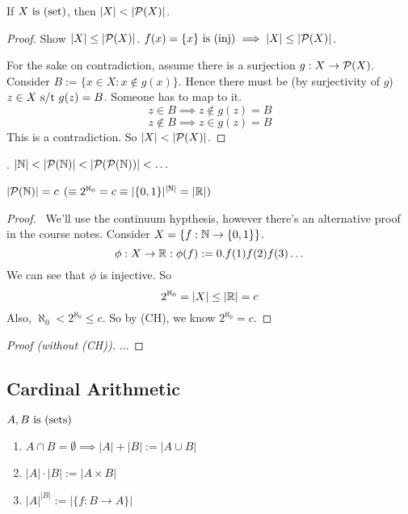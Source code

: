 \documentclass[12pt]{article}
\begin{document}
\bbox
\begin{prop}\label{prop:powerset_big}
  If \(X\ \mathrm{is}\ (\mathrm{set})\), then \(|X|<|\PP(X)|\).
\end{prop}
\ebox

\bboxproof
\begin{proof}
  Show \(|X|\le|\mathcal P(X)|\). \(f(x)=\{x\}\ \mathrm{is}\ (\mathrm{inj})\implies |X|\le|\mathcal P(X)|\). 

  For the sake on contradiction, assume there is a surjection \(g:X\to\mathcal P(X)\).
  Consider \(B:=\{x\in X:x\not\in g(x)\}\). Hence there must be (by surjectivity of \(g\))
  \(z\in X\text{ s/t } g(z)=B\). Someone has to map to it.
  \[z\in B\implies z\not\in g(z)=B\]
  \[z\not\in B\implies z\in g(z)=B\]
  This is a contradiction. So \(|X|<|\PP(X)|\).
\end{proof}
\ebox

\bboxnote\label{note:infinite_infinities}
. \(|\N|<|\PP(\N)|<|\PP(\PP(\N))|<\dots\)
\ebox

\bbox
\begin{prop}\label{prop:abs_pp_n_is_abs_r}
  \(|\mathcal P(\mathbb N)|=c\) \((\equiv 2^{\aleph_0}=c\equiv|\{0,1\}|^{|\mathbb N|}=|\mathbb R|)\)
\end{prop}
\ebox

\bboxproof
\begin{proof}\(\,\)
  \bboxnote
  We'll use the continuum hypthesis, however there's an alternative proof in 
  the course notes.
  \ebox
  Consider \(X=\{f:\mathbb N\to\{0,1\}\}\).
  \[\phi:X\to\mathbb R:\phi(f):=0.f(1)f(2)f(3)\dots\]
  We can see that \(\phi\) is injective. So
  \[2^{\aleph_0}=|X|\le|\mathbb R|=c\]
  Also, \(\aleph_0<2^{\aleph_0}\le c\). So by (CH), we know \(2^{\aleph_0}=c\).
\end{proof}
\ebox


\bboxproof
\begin{proof}[Proof (without (CH))]
  \(\dots\)
\end{proof}
\ebox

\subsection{Cardinal Arithmetic}

\bbox
\begin{defn}
  \(A,B\ \mathrm{is}\ (\mathrm{sets})\)
  \begin{enumerate}
    \item \(A\cap B=\emptyset\implies|A|+|B|:=|A\cup B|\)
    \item \(|A|\cdot|B|:=|A\times B|\)
    \item \(|A|^{|B|}:=|\{f:B\to A\}|\)
  \end{enumerate}
\end{defn}
\ebox
\end{document}
